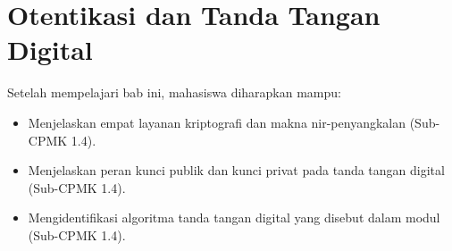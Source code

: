 \documentclass[../../main.tex]{subfiles}
\begin{document}
\chapter{Otentikasi dan Tanda Tangan Digital}
\label{chap:tanda-tangan-pki}

\begin{learningoutcome}
Setelah mempelajari bab ini, mahasiswa diharapkan mampu:
\begin{itemize}
    \item Menjelaskan empat layanan kriptografi dan makna nir-penyangkalan (Sub-CPMK 1.4).
    \item Menjelaskan peran kunci publik dan kunci privat pada tanda tangan digital (Sub-CPMK 1.4).
    \item Mengidentifikasi algoritma tanda tangan digital yang disebut dalam modul (Sub-CPMK 1.4).
\end{itemize}
\end{learningoutcome}










\end{document}
